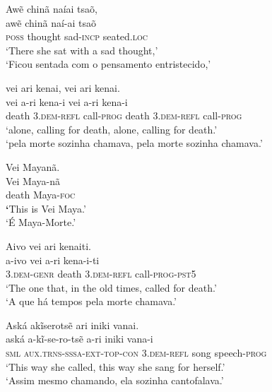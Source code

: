 \documentclass[output=paper,
modfonts,nonflat
]{langsci/langscibook}
\begin{document}
  \largerpage
\ea Awẽ chinã naíai tsaõ, \\[.3em]
\gll awẽ           chinã   naí-ai            tsaõ                \\
     \textsc{poss} thought sad-\textsc{incp} seated.\textsc{loc} \\
\glt `There she sat with a sad thought,' \\
`Ficou sentada com o pensamento entristecido,' \\
\z

\ea vei ari kenai, vei ari kenai. \\[.3em]
\gll vei   a-ri                kena-i             vei   a-ri                kena-i             \\
     death 3.\textsc{dem-refl} call-\textsc{prog} death 3.\textsc{dem-refl} call-\textsc{prog} \\
\glt `alone, calling for death, alone, calling for death.' \\
`pela morte sozinha chamava, pela morte sozinha chamava.' \\
\z

\ea Vei Mayanã. \\[.3em]
\gll Vei   Maya-nã           \\
     death Maya-\textsc{foc} \\
\glt \textbf{`}This is Vei Maya.' \\
`É Maya-Morte.' \\
\z

\ea Aivo vei ari kenaiti. \\[.3em]
\gll a-ivo               vei   a-ri                kena-i-ti               \\
     3.\textsc{dem-genr} death 3.\textsc{dem-refl} call-\textsc{prog-pst5} \\
\glt `The one that, in the old times, called for death.' \\
`A que há tempos pela morte chamava.' \\
\z

\ea Aská akĩserotsẽ ari iniki vanai. \\[.3em]
\gll aská         a-kĩ-se-ro-tsẽ                     a-ri                iniki vana-i               \\
     \textsc{sml} \textsc{aux.trns-sssa-ext-top-con} 3\textsc{.dem-refl} song  speech-\textsc{prog} \\
\glt `This way she called, this way she sang for herself.' \\
`Assim mesmo chamando, ela sozinha cantofalava.'  \\
\z
\end{document}
